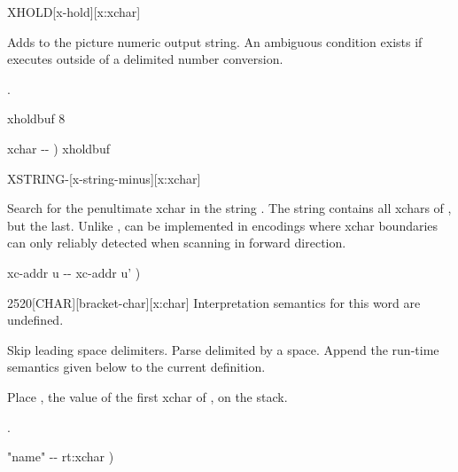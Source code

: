 \begin{worddef*}{}{XHOLD}[x-hold][x:xchar]
\item {}

	Adds  to the picture numeric output string.  An ambiguous
	condition exists if  executes outside of a 
	 delimited number conversion.

\see {}.

	\begin{implement}
	 xholdbuf 8 

	\word{:}   xchar -{}- )
		xholdbuf    \word{-}  \word{;}
	\end{implement}
\end{worddef*}


\begin{worddef*}[XSTRING-]{}{X\bs{}STRING-}[x-string-minus][x:xchar]
\item {}

	Search for the penultimate xchar in the string \param{xc-addr u_1}.
	The string  contains all xchars of
	, but the last.  Unlike \word{XCHAR-},
	 can be implemented in encodings where xchar
	boundaries can only reliably detected when scanning in forward
	direction.

	\begin{implement}
	\word{:}   xc-addr u -{}- xc-addr u' ) \\
	\tab {} \word{+}   \word{-} \word{;}
	\end{implement}
\end{worddef*}


\begin{worddef*}{2520}{[CHAR]}[bracket-char][x:char]
\interpret
	Interpretation semantics for this word are undefined.

\compile {}

	Skip leading space delimiters.  Parse  delimited by a space.
	Append the run-time semantics given below to the current definition.

\runtime {}

	Place , the value of the first xchar of , on
	the stack.

\see {}.

	\begin{implement}
	\word{:} \word{[CHAR]}  "name" -{}- rt:xchar ) \\
	\tab {}   \word{;} \word{IMMEDIATE}
	\end{implement}
\end{worddef*}

\endinput

